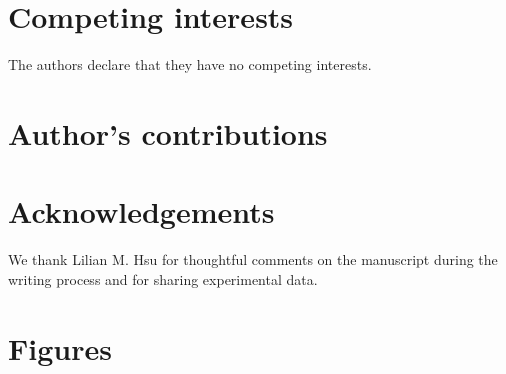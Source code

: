 \documentclass{bmcart}
\begin{document}
\begin{backmatter}

\section*{Competing interests}
  The authors declare that they have no competing interests.

\section*{Author's contributions}
   

\section*{Acknowledgements}
We thank Lilian M. Hsu for thoughtful comments on the manuscript during the
writing process and for sharing experimental data.

%

\section*{Figures}


\end{backmatter}
\end{document}
